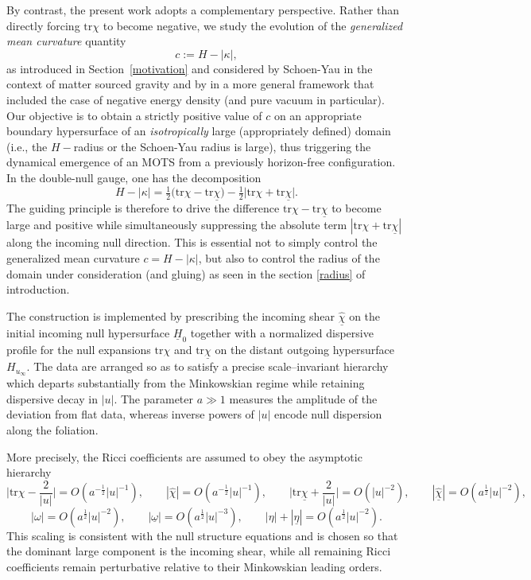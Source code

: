 \documentclass{amsart}
\newcommand{\chibar}{\underline{\chi}}
\newcommand{\tr}{\mbox{tr}}
\begin{document}
\medskip
\noindent
By contrast, the present work adopts a complementary perspective. Rather than directly forcing $\tr\chi$ to become negative, we study the evolution of the \emph{generalized mean curvature} quantity
\begin{equation}
\label{eq:c-def}
c := H - |\kappa|,
\end{equation}
as introduced in Section~\ref{motivation} and considered by Schoen-Yau \cite{SY83} in the context of matter sourced gravity and by \cite{yau} in a more general framework that included the case of negative energy density (and pure vacuum in particular). Our objective is to obtain a strictly positive value of $c$ on an appropriate boundary hypersurface of an \textit{isotropically} large (appropriately defined) domain (i.e., the $H-$radius or the Schoen-Yau radius is large), thus triggering the dynamical emergence of an MOTS from a previously horizon-free configuration. In the double-null gauge, one has the decomposition
\begin{equation}
\label{eq:Hkappa}
H - |\kappa| = \tfrac{1}{2}\big(\tr\chi - \tr\chibar\big)
              - \tfrac{1}{2}\big|\tr\chi + \tr\chibar\big|.
\end{equation}
The guiding principle is therefore to drive the difference $\tr\chi - \tr\chibar$ to become large and positive while simultaneously suppressing the absolute term $|\tr\chi+\tr\chibar|$ along the incoming null direction. This is essential not to simply control the generalized mean curvature $c=H-|\kappa|$, but also to control the radius of the domain under consideration (and gluing) as seen in the section \ref{radius} of introduction.



\medskip
\noindent
The construction is implemented by prescribing the incoming shear $\underline{\hat\chi}$ on the initial incoming null hypersurface $\underline H_{0}$ together with a normalized dispersive profile for the null expansions $\tr\chi$ and $\tr\underline\chi$ on the distant outgoing hypersurface $H_{u_\infty}$. The data are arranged so as to satisfy a precise scale–invariant hierarchy which departs substantially from the Minkowskian regime while retaining dispersive decay in $|u|$. The parameter $a\gg 1$ measures the amplitude of the deviation from flat data, whereas inverse powers of $|u|$ encode null dispersion along the foliation.

\noindent More precisely, the Ricci coefficients are assumed to obey the asymptotic hierarchy
\[
\bigg|\tr\chi-\frac{2}{|u|}\bigg|=O\!\left(a^{-\frac12}|u|^{-1}\right),
\qquad
|\hat\chi|=O\!\left(a^{-\frac12}|u|^{-1}\right),
\qquad
\bigg|\tr\underline\chi+\frac{2}{|u|}\bigg|=O\!\left(|u|^{-2}\right),
\qquad
|\underline{\hat\chi}|=O\!\left(a^{\frac12}|u|^{-2}\right),
\]
\[
|\omega|=O\!\left(a^{\frac12}|u|^{-2}\right),
\qquad
|\underline\omega|=O\!\left(a^{\frac12}|u|^{-3}\right),
\qquad
|\eta|+|\underline\eta|
=O\!\left(a^{\frac12}|u|^{-2}\right).
\]
This scaling is consistent with the null structure equations and is chosen so that the dominant large component is the incoming shear, while all remaining Ricci coefficients remain perturbative relative to their Minkowskian leading orders.
\end{document}
